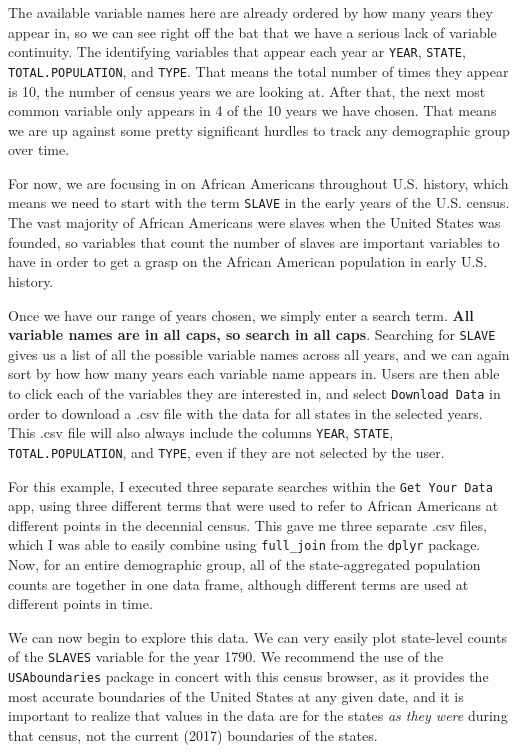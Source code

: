 \documentclass[11pt,]{article}
\begin{document}
The available variable names here are already ordered by how many years
they appear in, so we can see right off the bat that we have a serious
lack of variable continuity. The identifying variables that appear each
year ar \texttt{YEAR}, \texttt{STATE}, \texttt{TOTAL.POPULATION}, and
\texttt{TYPE}. That means the total number of times they appear is 10,
the number of census years we are looking at. After that, the next most
common variable only appears in 4 of the 10 years we have chosen. That
means we are up against some pretty significant hurdles to track any
demographic group over time.

For now, we are focusing in on African Americans throughout U.S.
history, which means we need to start with the term \texttt{SLAVE} in
the early years of the U.S. census. The vast majority of African
Americans were slaves when the United States was founded, so variables
that count the number of slaves are important variables to have in order
to get a grasp on the African American population in early U.S. history.

Once we have our range of years chosen, we simply enter a search term.
\textbf{All variable names are in all caps, so search in all caps}.
Searching for \texttt{SLAVE} gives us a list of all the possible
variable names across all years, and we can again sort by how how many
years each variable name appears in. Users are then able to click each
of the variables they are interested in, and select
\texttt{Download\ Data} in order to download a .csv file with the data
for all states in the selected years. This .csv file will also always
include the columns \texttt{YEAR}, \texttt{STATE},
\texttt{TOTAL.POPULATION}, and \texttt{TYPE}, even if they are not
selected by the user.

For this example, I executed three separate searches within the
\texttt{Get\ Your\ Data} app, using three different terms that were used
to refer to African Americans at different points in the decennial
census. This gave me three separate .csv files, which I was able to
easily combine using \texttt{full\_join} from the \texttt{dplyr}
package. Now, for an entire demographic group, all of the
state-aggregated population counts are together in one data frame,
although different terms are used at different points in time.

We can now begin to explore this data. We can very easily plot
state-level counts of the \texttt{SLAVES} variable for the year 1790. We
recommend the use of the \texttt{USAboundaries} package in concert with
this census browser, as it provides the most accurate boundaries of the
United States at any given date, and it is important to realize that
values in the data are for the states \emph{as they were} during that
census, not the current (2017) boundaries of the states.
\end{document}
